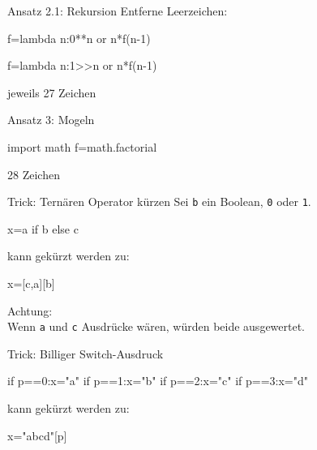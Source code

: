 \documentclass[xcolor=dvipsnames, aspectratio=169, 14pt]{beamer}
\begin{document}
\begin{frame}[fragile]{Ansatz 2.1: Rekursion}
	Entferne Leerzeichen:
	
	\vfill
	
	\begin{python3code}
	f=lambda n:0**n or n*f(n-1)
	\end{python3code}
	
	\vfill
	
	\begin{python3code}
	f=lambda n:1>>n or n*f(n-1)
	\end{python3code}

	
	\vfill
	
	jeweils 27 Zeichen
\end{frame}

\begin{frame}[fragile]{Ansatz 3: Mogeln}
	\begin{python3code}
	import math
	f=math.factorial
	\end{python3code}
	
	\vfill
	
	28 Zeichen
\end{frame}

\begin{frame}[fragile]{Trick: Ternären Operator kürzen}
	Sei \texttt{b} ein Boolean, \texttt{0} oder \texttt{1}.
	
	\vfill
	
	\begin{python3code}
	x=a if b else c
	\end{python3code}
	
	\vfill
	
	kann gekürzt werden zu:
	
	\vfill
	
	\begin{python3code}
	x=[c,a][b]
	\end{python3code}
	
	\pause
	
	Achtung:\\ Wenn \texttt{a} und \texttt{c} Ausdrücke wären, würden beide ausgewertet.
\end{frame}

\begin{frame}[fragile]{Trick: Billiger Switch-Ausdruck}
	\begin{python3code}
	if p==0:x="a"
	if p==1:x="b"
	if p==2:x="c"
	if p==3:x="d"
	\end{python3code}
	
	\vfill
	
	kann gekürzt werden zu:
	
	\vfill
	
	\begin{python3code}
	x="abcd"[p]
	\end{python3code}
\end{frame}
\end{document}
